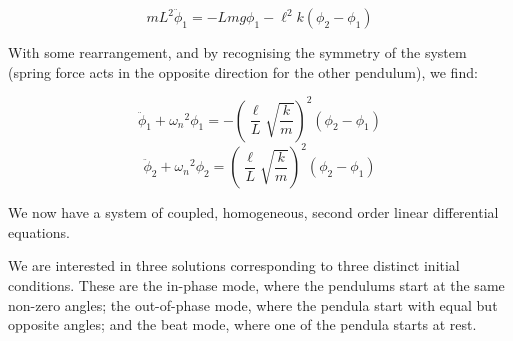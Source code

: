 \documentclass[aps,prl,reprint,10pt,amsmath,amssymb,superscriptaddress,a4paper, floatfix]{revtex4-2}
\begin{document}
\begin{equation}
   mL^2 \ddot{\phi}_1 = - L m g \phi_1  - \ell^2 k \left( \phi_2 - \phi_1 \right)
\end{equation}

With some rearrangement, and by recognising the symmetry of the system (spring force acts in the opposite direction for the other pendulum), we find:

\begin{equation}
\ddot{\phi}_1 + {\omega_n}^2 \phi_1 = - \left( \frac{\ell}{L} \sqrt{\frac{k}{m}} \right)^2  \left(\phi_2 -  \phi_1\right)
\end{equation} \begin{equation}
\ddot{\phi}_2 + {\omega_n}^2 \phi_2 = \left( \frac{\ell}{L} \sqrt{\frac{k}{m}} \right)^2  \left(\phi_2 -  \phi_1\right) 
\end{equation}

We now have a system of coupled, homogeneous, second order linear differential equations.

We are interested in three solutions corresponding to three distinct initial conditions. These are the in-phase mode, where the pendulums start at the same non-zero angles; the out-of-phase mode, where the pendula start with equal but opposite angles; and the beat mode, where one of the pendula starts at rest.

\pagebreak
\end{document}

